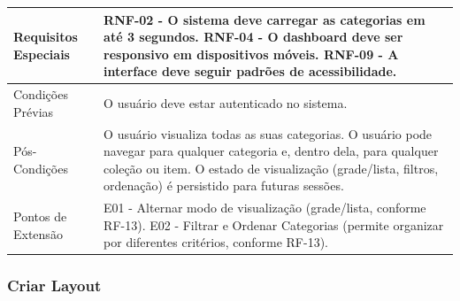 \begin{longtable}{ >{\raggedright}p{2.8cm} | >{\raggedright\arraybackslash}p{10.7cm} }
Requisitos Especiais & RNF-02 - O sistema deve carregar as categorias em até 3 segundos. RNF-04 - O dashboard deve ser responsivo em dispositivos móveis. RNF-09 - A interface deve seguir padrões de acessibilidade. \\ \hline

Condições Prévias & O usuário deve estar autenticado no sistema. \\ \hline

Pós-Condições & O usuário visualiza todas as suas categorias. O usuário pode navegar para qualquer categoria e, dentro dela, para qualquer coleção ou item. O estado de visualização (grade/lista, filtros, ordenação) é persistido para futuras sessões. \\ \hline

Pontos de Extensão & E01 - Alternar modo de visualização (grade/lista, conforme RF-13). E02 - Filtrar e Ordenar Categorias (permite organizar por diferentes critérios, conforme RF-13). \\
\end{longtable}
\renewcommand{\arraystretch}{1}
\FloatBarrier


\subsubsection{Criar Layout}

